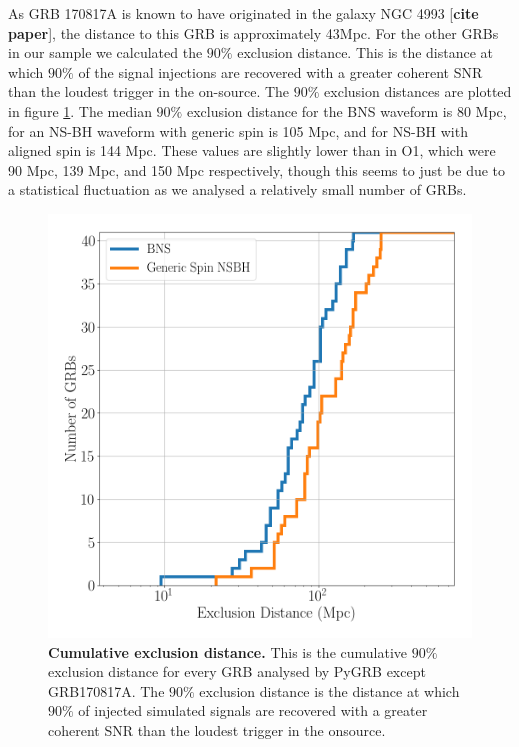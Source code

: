 \documentclass[11pt]{cuthesis}
\begin{document}
As GRB 170817A is known to have originated in the galaxy NGC 4993 [\textbf{cite paper}], the distance to this GRB is approximately 43Mpc. For the other GRBs in our sample we calculated the $90\%$ exclusion distance. This is the distance at which $90\%$ of the signal injections are recovered with a greater coherent SNR than the loudest trigger in the on-source. The $90\%$ exclusion distances are plotted in figure \ref{fig:ex dist}. The median $90\%$ exclusion distance for the BNS waveform is 80 Mpc, for an NS-BH waveform with generic spin is 105 Mpc, and for NS-BH with aligned spin is 144 Mpc. These values are slightly lower than in O1, which were 90 Mpc, 139 Mpc, and 150 Mpc respectively, though this seems to just be due to a statistical fluctuation as we analysed a relatively small number of GRBs. 

\begin{figure}
\begin{center}
\includegraphics[width=0.8\linewidth]{pygrb_exclusion_distance.png}
\end{center}
\caption{\textbf{Cumulative exclusion distance.} This is the cumulative $90\%$ exclusion distance for every GRB analysed by PyGRB except GRB170817A.  The $90\%$ exclusion distance is the distance at which $90\%$ of injected simulated signals are recovered with a greater coherent SNR than the loudest trigger in the onsource. }
\label{fig:ex dist}
\end{figure}
\end{document}
